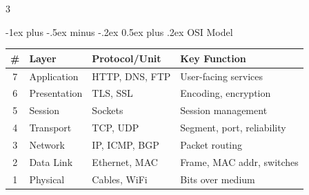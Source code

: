 \documentclass[10pt,landscape]{article}
\makeatletter
\renewcommand{\section}{\@startsection{section}{1}{0mm}%
                                {-1ex plus -.5ex minus -.2ex}%
                                {0.5ex plus .2ex}%
                                {\normalfont\large\bfseries}}
\makeatother
\begin{document}
\begin{multicols}{3}
{{
    }
}

\section{OSI Model}

{\footnotesize
\begin{tabular}{clll}
\toprule
\textbf{\#} & \textbf{Layer} & \textbf{Protocol/Unit} & \textbf{Key Function}\\
\midrule
7 & Application  & HTTP, DNS, FTP    & User-facing services\\
6 & Presentation & TLS, SSL          & Encoding, encryption\\
5 & Session      & Sockets           & Session management\\
4 & Transport    & TCP, UDP          & Segment, port, reliability\\
3 & Network      & IP, ICMP, BGP     & Packet routing\\
2 & Data Link    & Ethernet, MAC     & Frame, MAC addr, switches\\
1 & Physical     & Cables, WiFi      & Bits over medium\\
\bottomrule
\end{tabular}
}

\end{multicols}
\end{document}

